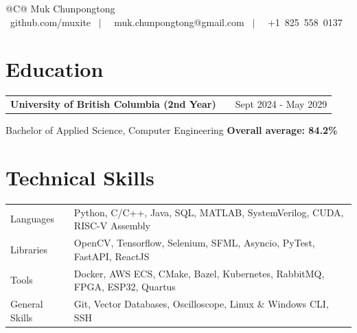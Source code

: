 \documentclass[a4paper,11pt]{article}
\begin{document}
\pagestyle{empty} 


\begin{tabularx}{\linewidth}{@{}C@{}}
\Huge{Muk Chunpongtong} \\[7.5pt]

\raisebox{-0.05\height}\ github.com/muxite \ $|$ \ 
\raisebox{-0.05\height}\ muk.chunpongtong@gmail.com \ $|$ \ 
\raisebox{-0.05\height}\ +1\ 825\ 558\ 0137 \\

\end{tabularx}



\section{Education}

\begin{tabularx}{\linewidth}{@{}l X r@{}}
\textbf{University of British Columbia (2nd Year)} & \hfill & Sept 2024 - May 2029 \\[3.75pt]
\end{tabularx}
\begin{minipage}[t]{\linewidth}
Bachelor of Applied Science, Computer Engineering \hfill \textbf{Overall average: 84.2\%}
\end{minipage}

\vspace{-1mm}

\section{Technical Skills}

\begin{tabularx}{\linewidth}{@{}>{\raggedright\arraybackslash}p{3cm} X@{}}
Languages & Python, C/C++, Java, SQL, MATLAB, SystemVerilog, CUDA, RISC-V Assembly \\
Libraries & OpenCV, Tensorflow, Selenium, SFML, Asyncio, PyTest, FastAPI, ReactJS \\
Tools & Docker, AWS ECS, CMake, Bazel, Kubernetes, RabbitMQ, FPGA, ESP32, Quartus \\
General Skills & Git, Vector Databases, Oscilloscope, Linux \& Windows CLI, SSH \\
\end{tabularx}
\end{document}
